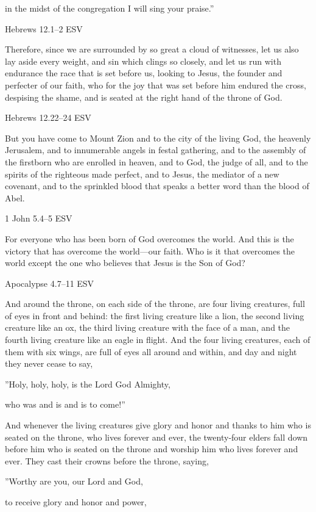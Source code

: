 \documentclass[
]{article}
\newcommand{\RL}[1]{\beginR #1\endR}
\begin{document}
in the midst of the congregation I will sing your praise.''

Hebrews 12.1--2 ESV

Therefore, since we are surrounded by so great a cloud of witnesses, let
us also lay aside every weight, and sin which clings so closely, and let
us run with endurance the race that is set before us, looking to Jesus,
the founder and perfecter of our faith, who for the joy that was set
before him endured the cross, despising the shame, and is seated at the
right hand of the throne of God.

Hebrews 12.22--24 ESV

But you have come to Mount Zion and to the city of the living God, the
heavenly Jerusalem, and to innumerable angels in festal gathering, and
to the assembly of the firstborn who are enrolled in heaven, and to God,
the judge of all, and to the spirits of the righteous made perfect, and
to Jesus, the mediator of a new covenant, and to the sprinkled blood
that speaks a better word than the blood of Abel.

1 John 5.4--5 ESV

For everyone who has been born of God overcomes the world. And this is
the victory that has overcome the world---our faith. Who is it that
overcomes the world except the one who believes that Jesus is the Son of
God?

Apocalypse 4.7--11 ESV

And around the throne, on each side of the throne, are four living
creatures, full of eyes in front and behind: the first living creature
like a lion, the second living creature like an ox, the third living
creature with the face of a man, and the fourth living creature like an
eagle in flight. And the four living creatures, each of them with six
wings, are full of eyes all around and within, and day and night they
never cease to say,

\RL{''}Holy, holy, holy, is the Lord God Almighty,

who was and is and is to come!''

And whenever the living creatures give glory and honor and thanks to him
who is seated on the throne, who lives forever and ever, the twenty-four
elders fall down before him who is seated on the throne and worship him
who lives forever and ever. They cast their crowns before the throne,
saying,

\RL{''}Worthy are you, our Lord and God,

to receive glory and honor and power,
\end{document}
